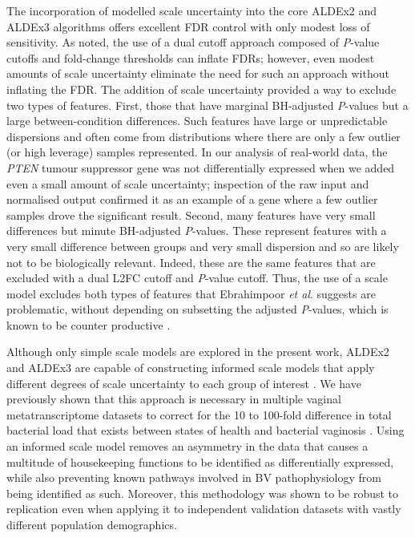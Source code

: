 \documentclass[10pt,letterpaper]{article}
\begin{document}
The incorporation of modelled scale uncertainty into the core ALDEx2 and ALDEx3 algorithms offers excellent FDR control with only modest loss of sensitivity. As noted,  the use of a dual cutoff approach composed of \textit{P}-value cutoffs and fold-change thresholds can inflate FDRs; however, even modest amounts of scale uncertainty eliminate the need for such an approach without inflating the FDR. The addition of scale uncertainty provided a way to exclude two types of features. First, those that have marginal BH-adjusted \textit{P}-values but a large between-condition differences. Such features have large or unpredictable dispersions and often come from  distributions where there are only a few outlier (or high leverage) samples represented.  In our analysis of real-world data, the \textit{PTEN} tumour suppressor gene was not differentially expressed when we added even a small amount of scale uncertainty; inspection of the raw input and normalised output confirmed it as an  example of a gene where a few outlier samples drove the significant result. Second, many features have very small differences but minute BH-adjusted \textit{P}-values. These represent features with a very small difference between groups and very small dispersion and so are likely not to be biologically relevant. Indeed, these are the same features that are excluded with a dual L2FC cutoff and \textit{P}-value cutoff. Thus, the use of a scale model excludes both types of features that Ebrahimpoor \textit{et al}. \cite{ebrahimpoor_inflated_2021} suggests are problematic, without depending on subsetting the adjusted \textit{P}-values, which is known to be counter productive \cite{Goeman:2014aa, ebrahimpoor_inflated_2021}.

Although only simple scale models are explored in the present work, ALDEx2 and ALDEx3 are capable of constructing informed scale models that apply different degrees of scale uncertainty to each group of interest \cite{nixon_scale_2024, nixon_incorporating_2025}. We have previously shown that this approach is necessary in multiple vaginal metatranscriptome datasets to correct for the 10 to 100-fold difference in total bacterial load that exists between states of health and bacterial vaginosis \cite{dos_santos_vaginal_2024, zozaya-hinchliffe_quantitative_2010}. Using an informed scale model removes an asymmetry in the data that causes a multitude of housekeeping functions to be identified as differentially expressed, while also preventing known pathways involved in BV pathophysiology from being identified as such. Moreover, this methodology was shown to be robust to replication even when applying it to independent validation datasets with vastly different population demographics.
\end{document}
